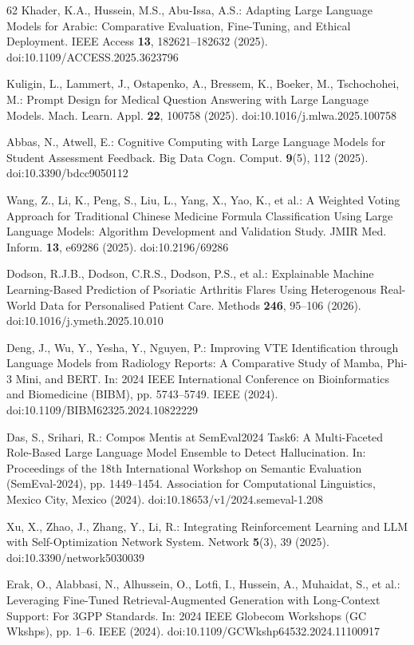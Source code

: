 \begin{thebibliography}{62}
Khader, K.A., Hussein, M.S., Abu-Issa, A.S.: Adapting Large Language Models for Arabic: Comparative Evaluation, Fine-Tuning, and Ethical Deployment. IEEE Access \textbf{13}, 182621--182632 (2025). doi:10.1109/ACCESS.2025.3623796

Kuligin, L., Lammert, J., Ostapenko, A., Bressem, K., Boeker, M., Tschochohei, M.: Prompt Design for Medical Question Answering with Large Language Models. Mach. Learn. Appl. \textbf{22}, 100758 (2025). doi:10.1016/j.mlwa.2025.100758

Abbas, N., Atwell, E.: Cognitive Computing with Large Language Models for Student Assessment Feedback. Big Data Cogn. Comput. \textbf{9}(5), 112 (2025). doi:10.3390/bdcc9050112

Wang, Z., Li, K., Peng, S., Liu, L., Yang, X., Yao, K., et al.: A Weighted Voting Approach for Traditional Chinese Medicine Formula Classification Using Large Language Models: Algorithm Development and Validation Study. JMIR Med. Inform. \textbf{13}, e69286 (2025). doi:10.2196/69286

Dodson, R.J.B., Dodson, C.R.S., Dodson, P.S., et al.: Explainable Machine Learning-Based Prediction of Psoriatic Arthritis Flares Using Heterogenous Real-World Data for Personalised Patient Care. Methods \textbf{246}, 95--106 (2026). doi:10.1016/j.ymeth.2025.10.010

Deng, J., Wu, Y., Yesha, Y., Nguyen, P.: Improving VTE Identification through Language Models from Radiology Reports: A Comparative Study of Mamba, Phi-3 Mini, and BERT. In: 2024 IEEE International Conference on Bioinformatics and Biomedicine (BIBM), pp. 5743--5749. IEEE (2024). doi:10.1109/BIBM62325.2024.10822229

Das, S., Srihari, R.: Compos Mentis at SemEval2024 Task6: A Multi-Faceted Role-Based Large Language Model Ensemble to Detect Hallucination. In: Proceedings of the 18th International Workshop on Semantic Evaluation (SemEval-2024), pp. 1449--1454. Association for Computational Linguistics, Mexico City, Mexico (2024). doi:10.18653/v1/2024.semeval-1.208

Xu, X., Zhao, J., Zhang, Y., Li, R.: Integrating Reinforcement Learning and LLM with Self-Optimization Network System. Network \textbf{5}(3), 39 (2025). doi:10.3390/network5030039

Erak, O., Alabbasi, N., Alhussein, O., Lotfi, I., Hussein, A., Muhaidat, S., et al.: Leveraging Fine-Tuned Retrieval-Augmented Generation with Long-Context Support: For 3GPP Standards. In: 2024 IEEE Globecom Workshops (GC Wkshps), pp. 1--6. IEEE (2024). doi:10.1109/GCWkshp64532.2024.11100917


\end{thebibliography}
